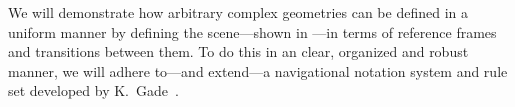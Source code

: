 We will demonstrate how arbitrary complex geometries can be defined in a uniform manner by defining the scene---shown in ---in terms of reference frames and transitions between them. To do this in an clear, organized and robust manner, we will adhere to---and extend---a navigational notation system and rule set developed by K.~Gade~\cite{Gade2018}.





 
%
% 








